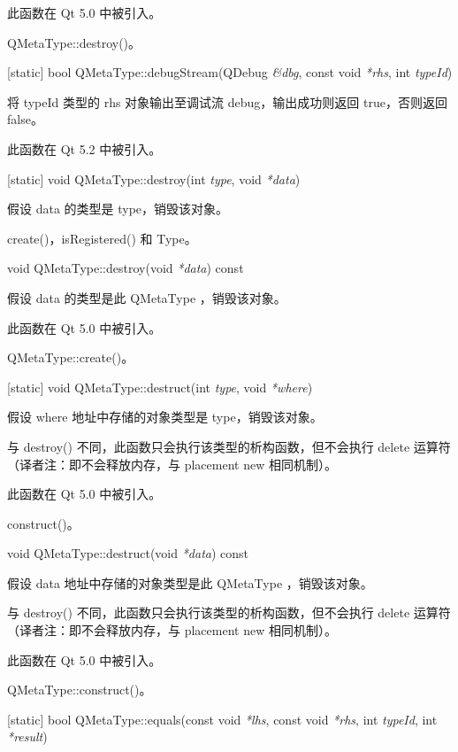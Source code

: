 此函数在 Qt 5.0 中被引入。

\begin{seeAlso}
QMetaType::destroy()。
\end{seeAlso}

[static] bool QMetaType::debugStream(QDebug \emph{\&dbg}, const void \emph{*rhs}, int \emph{typeId})

将 typeId 类型的 rhs 对象输出至调试流 debug，输出成功则返回 true，否则返回 false。

此函数在 Qt 5.2 中被引入。

[static] void QMetaType::destroy(int \emph{type}, void \emph{*data})

假设 data 的类型是 type，销毁该对象。

\begin{seeAlso}
create()，isRegistered() 和 Type。
\end{seeAlso}

void QMetaType::destroy(void \emph{*data}) const

假设 data 的类型是此 QMetaType ，销毁该对象。

此函数在 Qt 5.0 中被引入。

\begin{seeAlso}
QMetaType::create()。
\end{seeAlso}

[static] void QMetaType::destruct(int \emph{type}, void \emph{*where})

假设 where 地址中存储的对象类型是 type，销毁该对象。

与 destroy() 不同，此函数只会执行该类型的析构函数，但不会执行 delete 运算符（译者注：即不会释放内存，与 placement new 相同机制）。

此函数在 Qt 5.0 中被引入。

\begin{seeAlso}
construct()。
\end{seeAlso}

void QMetaType::destruct(void \emph{*data}) const

假设 data 地址中存储的对象类型是此 QMetaType ，销毁该对象。

与 destroy() 不同，此函数只会执行该类型的析构函数，但不会执行 delete 运算符（译者注：即不会释放内存，与 placement new 相同机制）。

此函数在 Qt 5.0 中被引入。

\begin{seeAlso}
QMetaType::construct()。
\end{seeAlso}

[static] bool QMetaType::equals(const void \emph{*lhs}, const void \emph{*rhs}, int \emph{typeId}, int \emph{*result})

